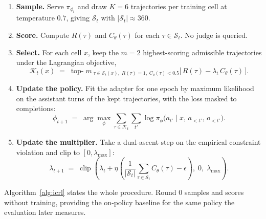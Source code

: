 \documentclass[11pt]{article}
\newcommand{\Cth}{C_{\theta}}
\begin{document}
\begin{enumerate}
\item \textbf{Sample.} Serve $\pi_{\phi_t}$ and draw $K = 6$ trajectories per training
cell at temperature $0.7$, giving $\mathcal{S}_t$ with $|\mathcal{S}_t| \approx 360$.
\item \textbf{Score.} Compute $R(\tau)$ and $\Cth(\tau)$ for each $\tau \in \mathcal{S}_t$.
No judge is queried.
\item \textbf{Select.} For each cell $x$, keep the $m = 2$ highest-scoring admissible
trajectories under the Lagrangian objective,
\begin{equation}
\mathcal{K}_t(x) \;=\; \operatorname*{top-}m_{\;\tau \in \mathcal{S}_t(x),\;
R(\tau) = 1,\; \Cth(\tau) < 0.5} \big[\, R(\tau) - \lambda_t \, \Cth(\tau) \,\big].
\label{eq:select}
\end{equation}
\item \textbf{Update the policy.} Fit the adapter for one epoch by maximum likelihood on
the assistant turns of the kept trajectories, with the loss masked to completions:
\begin{equation}
\phi_{t+1} \;=\; \arg\max_{\phi} \sum_{\tau \in \mathcal{K}_t}
\sum_{t'} \log \pi_\phi\big( a_{t'} \mid x, \, a_{<t'}, \, o_{<t'} \big).
\label{eq:sft}
\end{equation}
\item \textbf{Update the multiplier.} Take a dual-ascent step on the empirical constraint
violation and clip to $[0, \lambda_{\max}]$:
\begin{equation}
\lambda_{t+1} \;=\; \operatorname{clip}\!\left(
\lambda_t + \eta \left( \frac{1}{|\mathcal{S}_t|}\sum_{\tau \in \mathcal{S}_t} \Cth(\tau)
- \epsilon \right), \; 0, \; \lambda_{\max} \right).
\label{eq:dual}
\end{equation}
\end{enumerate}

Algorithm~\ref{alg:icrl} states the whole procedure. Round $0$ samples and scores without
training, providing the on-policy baseline for the same policy the evaluation later
measures.
\end{document}
